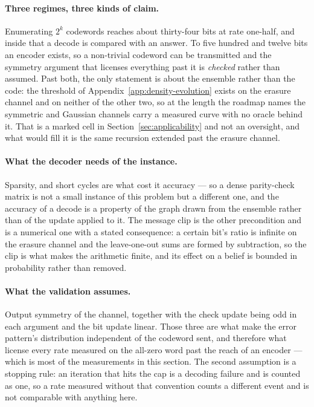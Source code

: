 \documentclass[11pt,a4paper]{article}
\begin{document}
\paragraph{Three regimes, three kinds of claim.}
Enumerating $2^k$ codewords reaches about thirty-four bits at rate
one-half, and inside that a decode is compared with an answer. To five
hundred and twelve bits an encoder exists, so a non-trivial codeword can be
transmitted and the symmetry argument that licenses everything past it is
\emph{checked} rather than assumed. Past both, the only statement is about
the ensemble rather than the code: the threshold of
Appendix~\ref{app:density-evolution} exists on the erasure channel and on
neither of the other two, so at the length the roadmap names the symmetric
and Gaussian channels carry a measured curve with no oracle behind it. That
is a marked cell in Section~\ref{sec:applicability} and not an oversight,
and what would fill it is the same recursion extended past the erasure
channel.

\paragraph{What the decoder needs of the instance.}
Sparsity, and short cycles are what cost it accuracy --- so a dense
parity-check matrix is not a small instance of this problem but a different
one, and the accuracy of a decode is a property of the graph drawn from the
ensemble rather than of the update applied to it. The message clip is the
other precondition and is a numerical one with a stated consequence: a
certain bit's ratio is infinite on the erasure channel and the leave-one-out
sums are formed by subtraction, so the clip is what makes the arithmetic
finite, and its effect on a belief is bounded in probability rather than
removed.

\paragraph{What the validation assumes.}
Output symmetry of the channel, together with the check update being odd in
each argument and the bit update linear. Those three are what make the error
pattern's distribution independent of the codeword sent, and therefore what
license every rate measured on the all-zero word past the reach of an
encoder --- which is most of the measurements in this section. The second
assumption is a stopping rule: an iteration that hits the cap is a decoding
failure and is counted as one, so a rate measured without that convention
counts a different event and is not comparable with anything here.
\end{document}
